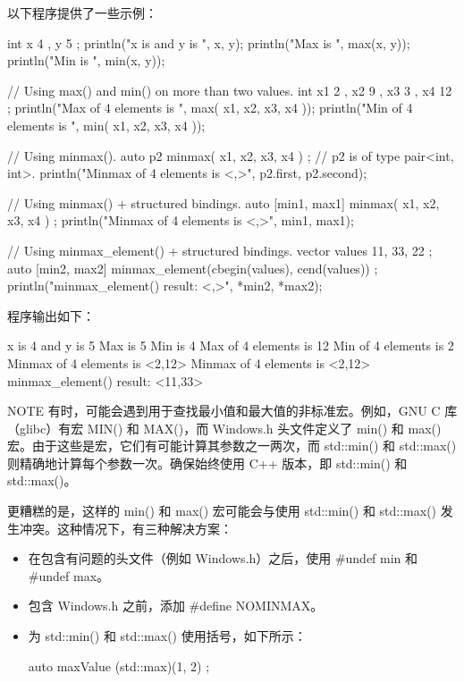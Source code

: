 以下程序提供了一些示例：

\begin{cpp}
int x { 4 }, y { 5 };
println("x is {} and y is {}", x, y);
println("Max is {}", max(x, y));
println("Min is {}", min(x, y));

// Using max() and min() on more than two values.
int x1 { 2 }, x2 { 9 }, x3 { 3 }, x4 { 12 };
println("Max of 4 elements is {}", max({ x1, x2, x3, x4 }));
println("Min of 4 elements is {}", min({ x1, x2, x3, x4 }));

// Using minmax().
auto p2 { minmax({ x1, x2, x3, x4 }) }; // p2 is of type pair<int, int>.
println("Minmax of 4 elements is <{},{}>", p2.first, p2.second);

// Using minmax() + structured bindings.
auto [min1, max1] { minmax({ x1, x2, x3, x4 }) };
println("Minmax of 4 elements is <{},{}>", min1, max1);

// Using minmax_element() + structured bindings.
vector values { 11, 33, 22 };
auto [min2, max2] { minmax_element(cbegin(values), cend(values)) };
println("minmax_element() result: <{},{}>", *min2, *max2);
\end{cpp}

程序输出如下：

\begin{shell}
x is 4 and y is 5
Max is 5
Min is 4
Max of 4 elements is 12
Min of 4 elements is 2
Minmax of 4 elements is <2,12>
Minmax of 4 elements is <2,12>
minmax_element() result: <11,33>
\end{shell}

\begin{myNotic}{NOTE}
有时，可能会遇到用于查找最小值和最大值的非标准宏。例如，GNU C 库（glibc）有宏 MIN() 和 MAX()，而 Windows.h 头文件定义了 min() 和 max() 宏。由于这些是宏，它们有可能计算其参数之一两次，而 std::min() 和 std::max() 则精确地计算每个参数一次。确保始终使用 C++ 版本，即 std::min() 和 std::max()。

更糟糕的是，这样的 min() 和 max() 宏可能会与使用 std::min() 和 std::max() 发生冲突。这种情况下，有三种解决方案：

\begin{itemize}
\item
在包含有问题的头文件（例如 Windows.h）之后，使用 \#undef min 和 \#undef max。

\item
包含 Windows.h 之前，添加 \#define NOMINMAX。

\item
为 std::min() 和 std::max() 使用括号，如下所示：

\begin{cpp}
auto maxValue { (std::max)(1, 2) };
\end{cpp}
\end{itemize}
\end{myNotic}

